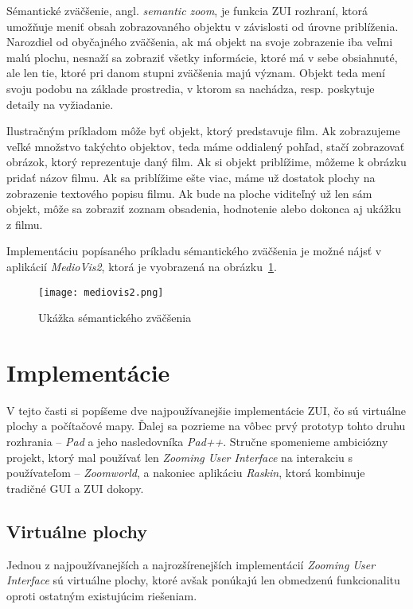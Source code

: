 Sémantické zväčšenie, angl. \textit{semantic zoom}, je funkcia ZUI rozhraní, ktorá umožňuje meniť obsah zobrazovaného objektu v závislosti od úrovne priblíženia. Narozdiel od obyčajného zväčšenia, ak má objekt na svoje zobrazenie iba veľmi malú plochu, nesnaží sa zobraziť všetky informácie, ktoré má v sebe obsiahnuté, ale len tie, ktoré pri danom stupni zväčšenia majú význam. Objekt teda mení svoju podobu na základe prostredia, v ktorom sa nachádza, resp. poskytuje detaily na vyžiadanie.

Ilustračným príkladom môže byť objekt, ktorý predstavuje film. Ak zobrazujeme veľké množstvo takýchto objektov, teda máme oddialený pohľad, stačí zobrazovať obrázok, ktorý reprezentuje daný film. Ak si objekt priblížime, môžeme k obrázku pridať názov filmu. Ak sa priblížime ešte viac, máme už dostatok plochy na zobrazenie textového popisu filmu. Ak bude na ploche viditeľný už len sám objekt, môže sa zobraziť zoznam obsadenia, hodnotenie alebo dokonca aj ukážku z filmu.

Implementáciu popísaného príkladu sémantického zväčšenia je možné nájsť v aplikácií \textit{MedioVis2}, ktorá je vyobrazená na obrázku~\ref{fig:semantic-zoom}.

\begin{figure}
 \texttt{[image: mediovis2.png]}
 \caption{Ukážka sémantického zväčšenia\label{fig:semantic-zoom}}
\end{figure}

\section{Implementácie}

V tejto časti si popíšeme dve najpoužívanejšie implementácie ZUI, čo sú virtuálne plochy a počítačové mapy. Ďalej sa pozrieme na vôbec prvý prototyp tohto druhu rozhrania -- \textit{Pad} a jeho nasledovníka \textit{Pad++}. Stručne spomenieme ambiciózny projekt, ktorý mal používať len \textit{Zooming User Interface} na interakciu s používateľom -- \textit{Zoomworld}, a nakoniec aplikáciu \textit{Raskin}, ktorá kombinuje tradičné GUI a ZUI dokopy.

\subsection{Virtuálne plochy}
Jednou z najpoužívanejších a najrozšírenejších implementácií \textit{Zooming User Interface} sú virtuálne plochy, ktoré avšak ponúkajú len obmedzenú funkcionalitu oproti ostatným existujúcim riešeniam.

